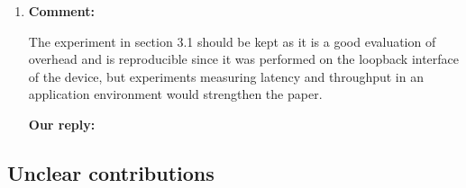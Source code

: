 \documentclass{article}
\begin{document}
\begin{enumerate}
\item \begin{flushleft}
    \textbf{Comment:}
  \end{flushleft}
  The experiment in section 3.1 should be kept as it is a good evaluation of overhead and is reproducible since it was performed on the loopback interface of the device, but experiments measuring latency and throughput in an application environment would strengthen the paper.

  \begin{flushleft}
    \textbf{Our reply:}
  \end{flushleft}

\end{enumerate}

\subsection{Unclear contributions}
\end{document}
